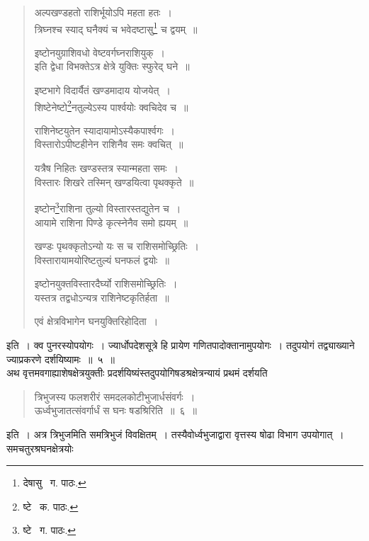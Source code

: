 \documentclass[11pt, openany]{book}
\begin{document}
\begin{quote}
{\qt अल्पखण्डहतो राशिर्भूयोऽपि महता हतः~।\\
त्रिघ्नश्च स्याद् घनैक्यं च भवेदष्टासु\renewcommand{\thefootnote}{१}\footnote{देषासु \textendash\ ग. पाठः.} च द्वयम्~॥

इष्टोनयुग्राशिवधो वेष्टवर्गघ्नराशियुक्~।\\
इति द्वेधा विभक्तेऽत्र क्षेत्रे युक्तिः स्फुरेद् घने~॥

इष्टभागे विदार्यैतं खण्डमादाय योजयेत्~।\\
शिष्टेनेष्टो\renewcommand{\thefootnote}{२}\footnote{ष्टे \textendash\ क. पाठः.}नतुल्येऽस्य पार्श्वयोः क्वचिदेव च~॥

राशिनेष्टयुतेन स्यादायामोऽस्यैकपार्श्वगः~।\\
विस्तारोऽपीष्टहीनेन राशिनैव समः क्वचित्~॥

यत्रैष निहितः खण्डस्तत्र स्यान्महता समः~।\\
विस्तारः शिखरे तस्मिन् खण्डयित्वा पृथक्कृते~॥

इष्टोन\renewcommand{\thefootnote}{३}\footnote{ष्टे \textendash\ ग. पाठः.}राशिना तुल्यो विस्तारस्तद्युतेन च~।\\ 
आयामे राशिना पिण्डे कृत्स्नेनैव समो ह्ययम्~॥

खण्डः पृथक्कृतोऽन्यो यः स च राशिसमोच्छ्रितिः~।\\
विस्तारायामयोरिष्टतुल्यं घनफलं द्वयोः~॥

इष्टोनयुक्तविस्तारदैर्घ्यो राशिसमोच्छ्रितिः~।\\
यस्तत्र तद्वधोऽन्यत्र राशिनेष्टकृतिर्हता~॥

एवं क्षेत्रविभागेन घनयुक्तिरिहोदिता~।}
\end{quote}

\noindent इति~। क्व पुनरस्योपयोगः~। ज्यार्धोपदेशसूत्रे हि प्रायेण गणितपादोक्तानामुपयोगः~। तदुपयोगं तद्व्याख्याने ज्याप्रकरणे दर्शयिष्यामः~॥~५~॥ \\

अथ वृत्तमवगाह्याशेषक्षेत्रयुक्तीः प्रदर्शयिष्यंस्तदुपयोगिषडश्रक्षेत्रन्यायं प्रथमं दर्शयति\textendash 

\begin{quote}
{\ab त्रिभुजस्य फलशरीरं समदलकोटीभुजार्धसंवर्गः~।\\
ऊर्ध्वभुजातत्संवर्गार्धं स घनः षडश्रिरिति~॥~६~॥}
\end{quote}

इति~। अत्र त्रिभुजमिति समत्रिभुजं विवक्षितम्~। तस्यैवोर्ध्वभुजाद्वारा वृत्तस्य षोढा विभाग उपयोगात्~। समचतुरश्रघनक्षेत्रयोः 

\newpage
\end{document}
